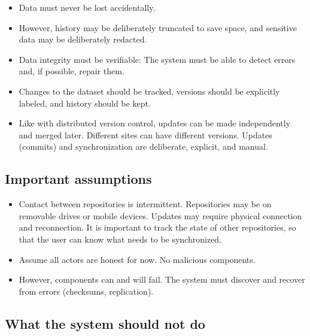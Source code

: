 \documentclass[a4paper]{article}
\begin{document}
\begin{itemize}

  \item Data must never be lost accidentally.

  \item However, history may be deliberately truncated to save space, and
    sensitive data may be deliberately redacted.

  \item Data integrity must be verifiable: The system must be able to detect
    errors and, if possible, repair them.

  \item Changes to the dataset should be tracked, versions should be explicitly
    labeled, and history should be kept.

  \item Like with distributed version control, updates can be made independently
    and merged later. Different sites can have different versions. Updates
    (commits) and synchronization are deliberate, explicit, and manual.

\end{itemize}


\subsection{Important assumptions}

\begin{itemize}

  \item Contact between repositories is intermittent. Repositories may be on
    removable drives or mobile devices. Updates may require physical connection
    and reconnection. It is important to track the state of other repositories,
    so that the user can know what needs to be synchronized.

  \item Assume all actors are honest for now. No malicious components.

  \item However, components can and will fail. The system must discover and
    recover from errors (checksums, replication).

\end{itemize}


\subsection{What the system should not do}
\end{document}
